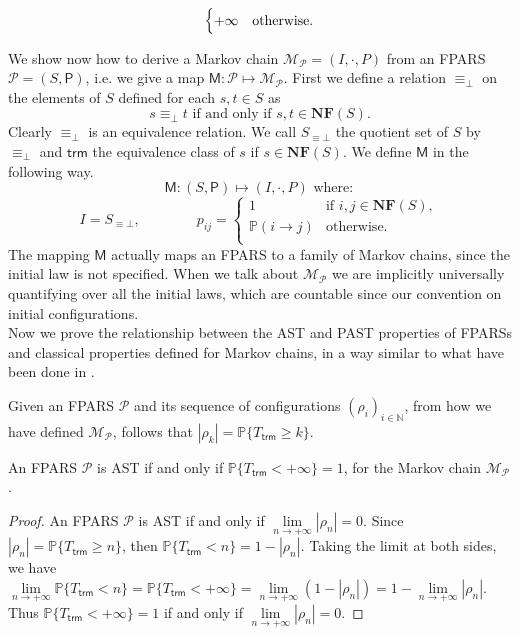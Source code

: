 \begin{LONG}
\begin{definition}
$$\begin{cases}
		+\infty & \textnormal{otherwise}.
		\end{cases}
		$$
	\end{definition}
	We show now how to derive a Markov chain $\mathcal{M_P}=(I,\cdot,P)$ from an FPARS $\mathcal{P}=(S,\mathsf{P})$, i.e. we give a map $\mathsf{M}:\mathcal{P}\longmapsto\mathcal{M_P}$. First we define a relation $\equiv_\bot$ on the elements of $S$ defined for each $s,t\in S$ as
	$$
	s\equiv_\bot t\text{ if and only if }s,t\in\mathbf{NF}(S).
	$$
	Clearly $\equiv_\bot$ is an equivalence relation. We call $S_{\equiv\bot}$ the quotient set of $S$ by $\equiv_\bot$ and $\mathsf{trm}$ the equivalence class of $s$ if $s\in\mathbf{NF}(S)$. We define $\mathsf{M}$ in the following way.
	$$
	\mathsf{M}:(S,\mathsf{P})\longmapsto(I,\cdot,P) \text{ where}:
	$$
	$$
	I=S_{\equiv\bot},\qquad\qquad
	p_{ij}=\begin{cases}
	1 & \text{if } i,j\in\mathbf{NF}(S),\\
	\mathbb{P}(i\rightarrow j) & \text{otherwise}.\\	
	\end{cases}	
	$$
	The mapping $\mathsf{M}$ actually maps an FPARS to a family of Markov chains, since the initial law is not specified. When we talk about $\mathcal{M_P}$ we are implicitly universally quantifying over all the initial laws, which are countable since our convention on initial configurations.\\
	Now we prove the relationship between the AST and PAST properties of FPARSs and classical properties defined for Markov chains, in a way similar to what have been done in \cite{bournez_proving_2005,ferrer_fioriti_probabilistic_2015}.
	\begin{remark}
		Given an FPARS $\mathcal{P}$ and its sequence of configurations $(\rho_i)_{i\in\mathbb{N}}$, from how we have defined $\mathcal{M_P}$, follows that $|\rho_k| = \mathbb{P}\{T_\mathsf{trm}\geq k\}$.
	\end{remark}
	\begin{proposition}
		An FPARS $\mathcal{P}$ is AST if and only if $\mathbb{P}\{T_{\mathsf{trm}}<+\infty\}=1$, for the Markov chain $\mathcal{M_P}$.
	\end{proposition}
	\begin{proof}
		An FPARS $\mathcal{P}$ is AST if and only if $\underset{n\rightarrow +\infty}{\lim}\left|\rho_{n}\right|=0$. Since $|\rho_n| = \mathbb{P}\{T_\mathsf{trm}\geq n\}$, then $\mathbb{P}\{T_\mathsf{trm}< n\}=1-|\rho_n|$. Taking the limit at both sides, we have $\underset{n\rightarrow +\infty}{\lim} \mathbb{P}\{T_\mathsf{trm}< n\} = \mathbb{P}\{T_\mathsf{trm}< +\infty\}= \underset{n\rightarrow +\infty}{\lim} (1-|\rho_n|)=1-\underset{n\rightarrow+\infty}{\lim} |\rho_n|$. Thus $\mathbb{P}\{T_\mathsf{trm}< +\infty\}=1$ if and only if $\underset{n\rightarrow+\infty}{\lim} |\rho_n|=0.$

\end{proof}
\end{LONG}
